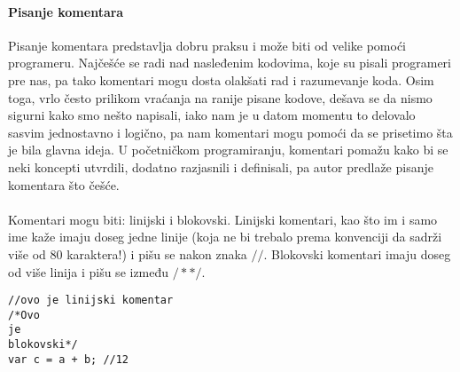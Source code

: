 \paragraph{Pisanje komentara}
Pisanje komentara predstavlja dobru praksu i može biti od velike pomoći programeru. Najčešće se radi nad nasleđenim kodovima, koje su pisali programeri pre nas, pa tako komentari mogu dosta olakšati rad i razumevanje koda. Osim toga, vrlo često prilikom vraćanja na ranije pisane kodove, dešava se da nismo sigurni kako smo nešto napisali, iako nam je u datom momentu to delovalo sasvim jednostavno i logično, pa nam komentari mogu pomoći da se prisetimo šta je bila glavna ideja. U početničkom programiranju, komentari pomažu kako bi se neki koncepti utvrdili, dodatno razjasnili i definisali, pa autor predlaže pisanje komentara što češće.\\\\ 
Komentari mogu biti: linijski i blokovski. Linijski komentari, kao što im i samo ime kaže imaju doseg jedne linije (koja ne bi trebalo prema konvenciji da sadrži više od 80 karaktera!) i pišu se nakon znaka $//$. Blokovski komentari imaju doseg od više linija i pišu se između $/**/$.
\begin{lstlisting}[backgroundcolor = \color{lightgray}, breaklines=true]
//ovo je linijski komentar
/*Ovo 
je 
blokovski*/
var c = a + b; //12
\end{lstlisting}

